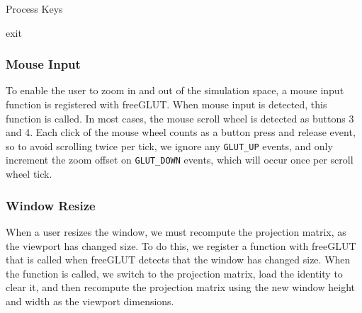 \documentclass[fleqn,10pt]{UserGuideArx} %
\begin{document}
    \begin{algorithm}
        \caption{Process Keys}\label{fig:RenderFunction}
        {
            {
                exit
            }
        }
        
        {
        }
    \end{algorithm}

    
\subsubsection{Mouse Input}
    To enable the user to zoom in and out of the simulation space, a mouse input function is registered with freeGLUT. When mouse input is detected, this function is called. In most cases, the mouse scroll wheel is detected as buttons 3 and 4. Each click of the mouse wheel counts as a button press and release event, so to avoid scrolling twice per tick, we ignore any \texttt{GLUT\_UP} events, and only increment the zoom offset on \texttt{GLUT\_DOWN} events, which will occur once per scroll wheel tick.\\
     
\subsubsection{Window Resize}
    When a user resizes the window, we must recompute the projection matrix, as the viewport has changed size. To do this, we register a function with freeGLUT that is called when freeGLUT detects that the window has changed size. When the function is called, we switch to the projection matrix, load the identity to clear it, and then recompute the projection matrix using the new window height and width as the viewport dimensions.\\
    
\end{document}
